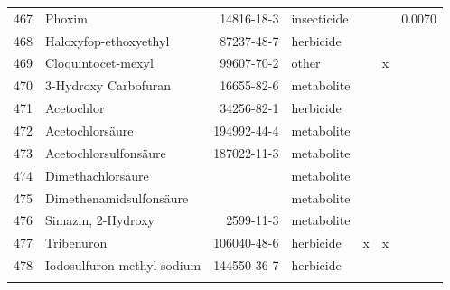 \begin{longtable}{lp{3cm}rlp{0.5cm}p{0.5cm}p{1.5cm}}
  467 & Phoxim & 14816-18-3 & insecticide &  &  & 0.0070 \\ 
  468 & Haloxyfop-ethoxyethyl & 87237-48-7 & herbicide &  &  &  \\ 
  469 & Cloquintocet-mexyl & 99607-70-2 & other &  & x &  \\ 
  470 & 3-Hydroxy Carbofuran & 16655-82-6 & metabolite &  &  &  \\ 
  471 & Acetochlor & 34256-82-1 & herbicide &  &  &  \\ 
  472 & Acetochlorsäure & 194992-44-4 & metabolite &  &  &  \\ 
  473 & Acetochlorsulfonsäure & 187022-11-3 & metabolite &  &  &  \\ 
  474 & Dimethachlorsäure &  & metabolite &  &  &  \\ 
  475 & Dimethenamidsulfonsäure &  & metabolite &  &  &  \\ 
  476 & Simazin, 2-Hydroxy & 2599-11-3 & metabolite &  &  &  \\ 
  477 & Tribenuron & 106040-48-6 & herbicide & x & x &  \\ 
  478 & Iodosulfuron-methyl-sodium & 144550-36-7 & herbicide &  &  &  \\ 
  \label{tab:phch_var}
\end{longtable}
